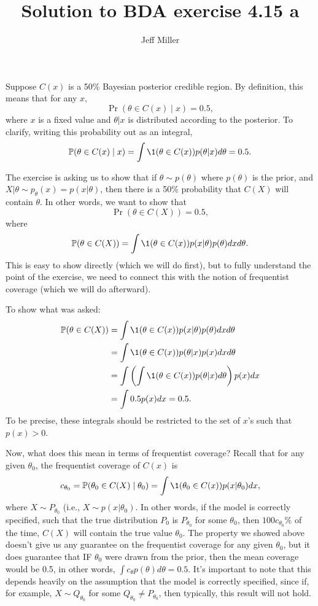 \documentclass[12pt]{article}
\title{Solution to BDA exercise 4.15 a
}
\author{Jeff Miller}
\begin{document}
\maketitle

Suppose $C(x)$ is a 50\% Bayesian posterior credible region. By definition, this means that for any $x$,
$$ \Pr(\theta\in C(x) \mid x) = 0.5, $$
where $x$ is a fixed value and $\theta | x$ is distributed according to the posterior.  To clarify, writing this probability out as an integral,
$$ \Pr(\theta\in C(x) \mid x) = \int \1(\theta \in C(x)) p(\theta | x) d \theta = 0.5. $$

The exercise is asking us to show that if $\theta \sim p(\theta)$ where $p(\theta)$ is the prior, and $X | \theta \sim p_\theta(x) = p(x|\theta)$, then there is a 50\% probability that $C(X)$ will contain $\theta$. In other words, we want to show that
$$ \Pr(\theta \in C(X)) = 0.5, $$
where
$$ \Pr(\theta \in C(X)) = \int \1(\theta \in C(x)) p(x | \theta) p(\theta) d x d \theta.$$
This is easy to show directly (which we will do first), but to fully understand the point of the exercise, we need to connect this with the notion of frequentist coverage (which we will do afterward).

To show what was asked:
\begin{align*}
\Pr(\theta \in C(X)) &= \int \1(\theta \in C(x)) p(x | \theta) p(\theta) d x d \theta \\
&= \int \1(\theta \in C(x)) p(\theta | x) p(x) d x d \theta\\
&= \int \left( \int \1(\theta \in C(x)) p(\theta | x) d \theta\right) p(x) d x\\
&= \int 0.5 p(x) d x  = 0.5.
\end{align*}
To be precise, these integrals should be restricted to the set of $x$'s such that $p(x) >0$.

Now, what does this mean in terms of frequentist coverage? Recall that for any given $\theta_0$, the frequentist coverage of $C(x)$ is
$$ c_{\theta_0} = \Pr(\theta_0 \in C(X) \mid \theta_0)
 = \int \1(\theta_0 \in C(x)) p(x | \theta_0) d x, $$
where $X \sim P_{\theta_0}$ (i.e., $X\sim p(x|\theta_0)$. In other words, if the model is correctly specified, such that the true distribution $P_0$ is $P_{\theta_0}$ for some $\theta_0$, then $100 c_{\theta_0} \%$ of the time, $C(X)$ will contain the true value $\theta_0$. The property we showed above doesn't give us any guarantee on the frequentist coverage for any given $\theta_0$, but it does guarantee that IF $\theta_0$ were drawn from the prior, then the mean coverage would be 0.5, in other words, $\int c_{\theta} p(\theta) d \theta = 0.5$. It's important to note that this depends heavily on the assumption that the model is correctly specified, since if, for example, $X\sim Q_{\theta_0}$ for some $Q_{\theta_0}\neq P_{\theta_0}$, then typically, this result will not hold.
\end{document}
